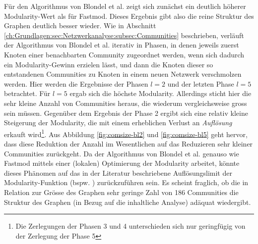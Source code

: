 F\"ur den Algorithmus von Blondel et al. zeigt sich zun\"achst ein
deutlich h\"oherer Modularity-Wert als f\"ur Fastmod. Dieses Ergebnis
gibt also die reine Struktur des Graphen deutlich besser wieder.  Wie
in Abschnitt
\ref{ch:Grundlagen:sec:Netzwerkanalyse:subsec:Communities}
beschrieben, verl\"auft der Algorithmus von Blondel et al. iterativ in
Phasen, in denen jeweils zuerst Knoten einer benachbarten Community
zugeordnet werden, wenn sich dadurch ein Modularity-Gewinn erzielen
l\"asst, und dann die Knoten dieser so entstandenen Communities zu
Knoten in einem neuen Netzwerk verschmolzen werden. Hier werden die
Ergebnisse der Phasen $l=2$ und der letzten Phase $l=5$
betrachtet. F\"ur $l=5$ ergab sich die h\"ochste
Modularity. Allerdings sticht hier die sehr kleine Anzahl von
Communities heraus, die wiederum vergleichsweise gross sein
m\"ussen. Gegen\"uber dem Ergebnis der Phase 2 ergibt sich eine
relativ kleine Steigerung der Modularity, die mit einem erheblichen
Verlust an \emph{Aufl\"osung} erkauft wird\footnote{Die Zerlegungen
  der Phasen 3 und 4 unterschieden sich nur geringf\"ugig von der
  Zerlegung der Phase 5}. Aus Abbildung \ref{fig:comsize-bl2} und
\ref{fig:comsize-bl5} geht hervor, dass diese Reduktion der Anzahl im
Wesentlichen auf das Reduzieren sehr kleiner Communities
zur\"uckgeht. Da der Algorithmus von Blondel et al. genauso wie
Fastmod mittels einer (lokalen) Optimierung der Modularity arbeitet,
k\"onnte dieses Ph\"anomen auf das in der Literatur beschriebene
Aufl\"osungslimit der Modularity-Funktion (bspw. \cite{Fortunato2007}
\cite{Good2009}) zur\"uckzuf\"uhren sein. Es scheint fraglich, ob die
in Relation zur Gr\"osse des Graphen sehr geringe Zahl von 186
Communities die Struktur des Graphen (in Bezug auf die inhaltliche
Analyse) ad\"aquat wiedergibt.

